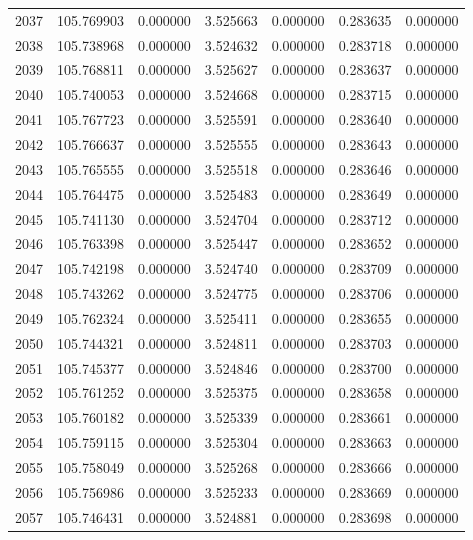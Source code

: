 \begin{tabular}{rrrrrrr}
2037 & 105.769903 &    0.000000 &  3.525663 &   0.000000 &   0.283635 &  0.000000 \\
2038 & 105.738968 &    0.000000 &  3.524632 &   0.000000 &   0.283718 &  0.000000 \\
2039 & 105.768811 &    0.000000 &  3.525627 &   0.000000 &   0.283637 &  0.000000 \\
2040 & 105.740053 &    0.000000 &  3.524668 &   0.000000 &   0.283715 &  0.000000 \\
2041 & 105.767723 &    0.000000 &  3.525591 &   0.000000 &   0.283640 &  0.000000 \\
2042 & 105.766637 &    0.000000 &  3.525555 &   0.000000 &   0.283643 &  0.000000 \\
2043 & 105.765555 &    0.000000 &  3.525518 &   0.000000 &   0.283646 &  0.000000 \\
2044 & 105.764475 &    0.000000 &  3.525483 &   0.000000 &   0.283649 &  0.000000 \\
2045 & 105.741130 &    0.000000 &  3.524704 &   0.000000 &   0.283712 &  0.000000 \\
2046 & 105.763398 &    0.000000 &  3.525447 &   0.000000 &   0.283652 &  0.000000 \\
2047 & 105.742198 &    0.000000 &  3.524740 &   0.000000 &   0.283709 &  0.000000 \\
2048 & 105.743262 &    0.000000 &  3.524775 &   0.000000 &   0.283706 &  0.000000 \\
2049 & 105.762324 &    0.000000 &  3.525411 &   0.000000 &   0.283655 &  0.000000 \\
2050 & 105.744321 &    0.000000 &  3.524811 &   0.000000 &   0.283703 &  0.000000 \\
2051 & 105.745377 &    0.000000 &  3.524846 &   0.000000 &   0.283700 &  0.000000 \\
2052 & 105.761252 &    0.000000 &  3.525375 &   0.000000 &   0.283658 &  0.000000 \\
2053 & 105.760182 &    0.000000 &  3.525339 &   0.000000 &   0.283661 &  0.000000 \\
2054 & 105.759115 &    0.000000 &  3.525304 &   0.000000 &   0.283663 &  0.000000 \\
2055 & 105.758049 &    0.000000 &  3.525268 &   0.000000 &   0.283666 &  0.000000 \\
2056 & 105.756986 &    0.000000 &  3.525233 &   0.000000 &   0.283669 &  0.000000 \\
2057 & 105.746431 &    0.000000 &  3.524881 &   0.000000 &   0.283698 &  0.000000 \\

\end{tabular}

